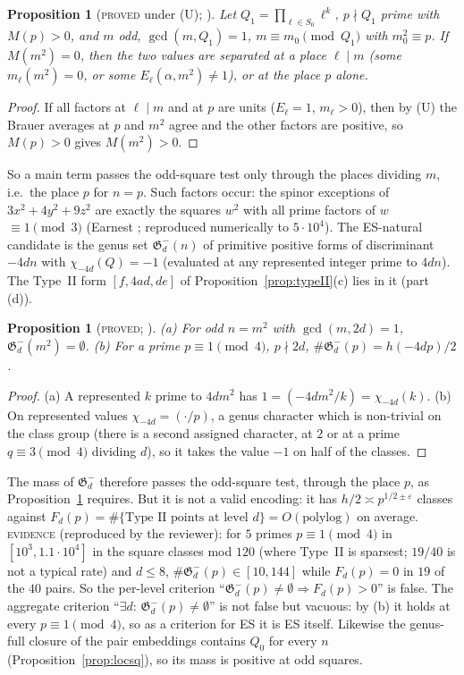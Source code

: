 \documentclass[10pt,reqno]{amsart}
\newtheorem{proposition}[theorem]{Proposition}
\theoremstyle{definition}
\numberwithin{equation}{section}
\newcommand{\status}[1]{\textup{\textsc{#1}}}
\begin{document}
\begin{proposition}[\status{proved} under (U); {\cite[\S5.1]{LF}}]\label{prop:Utest}
Let $Q_1=\prod_{\ell\in S_0}\ell^k$, $p\nmid Q_1$ prime with $M(p)>0$, and $m$ odd,
$\gcd(m,Q_1)=1$, $m\equiv m_0\pmod{Q_1}$ with $m_0^2\equiv p$. If $M(m^2)=0$,
then the two values are separated at a place $\ell\mid m$ (some $m_\ell(m^2)=0$,
or some $E_\ell(\alpha,m^2)\ne1$), or at the place $p$ alone.
\end{proposition}
\begin{proof}
If all factors at $\ell\mid m$ and at $p$ are units ($E_\ell=1$, $m_\ell>0$),
then by (U) the Brauer averages at $p$ and $m^2$ agree and the other factors
are positive, so $M(p)>0$ gives $M(m^2)>0$.
\end{proof}
So a main term passes the odd-square test only through the places
dividing $m$, i.e.\ the place $p$ for $n=p$. Such factors occur: the spinor exceptions of $3x^2+4y^2+9z^2$ are exactly the squares
$w^2$ with all prime factors of $w$ $\equiv1\pmod3$ (Earnest \cite[Prop.~5.1]{Ea};
reproduced numerically to $5\cdot10^4$). The ES-natural candidate is the
genus set $\mathfrak G^-_d(n)$ of primitive positive forms of
discriminant $-4dn$ with $\chi_{-4d}(Q)=-1$ (evaluated at any represented
integer prime to $4dn$). The Type~II form $[f,4ad,de]$ of
Proposition~\ref{prop:typeII}(c) lies in it (part (d)).

\begin{proposition}[\status{proved}; {\cite[\S5.3]{LF}}]\label{prop:genusminus}
\textup{(a)} For odd $n=m^2$ with $\gcd(m,2d)=1$, $\mathfrak G^-_d(m^2)=\emptyset$.
\textup{(b)} For a prime $p\equiv1\pmod4$, $p\nmid2d$,
$\#\mathfrak G^-_d(p)=h(-4dp)/2$.
\end{proposition}
\begin{proof}
(a) A represented $k$ prime to $4dm^2$ has
$1=(-4dm^2/k)=\chi_{-4d}(k)$. (b) On represented values $\chi_{-4d}=(\cdot/p)$,
a genus character which is non-trivial on the class group (there is a
second assigned character, at $2$ or at a prime $q\equiv3\pmod4$ dividing $d$),
so it takes the value $-1$ on half of the classes.
\end{proof}
The mass of $\mathfrak G^-_d$ therefore passes the odd-square test, through
the place $p$, as Proposition~\ref{prop:Utest} requires. But it is not a
valid encoding: it has $h/2\asymp p^{1/2\pm\varepsilon}$ classes against
$F_d(p)=\#\{\text{Type~II points at level }d\}=O(\text{polylog})$ on average.
\status{evidence} (reproduced by the reviewer): for $5$ primes
$p\equiv1\pmod4$ in $[10^3,1.1\cdot10^4]$ in the square classes mod $120$ (where
Type~II is sparsest; $19/40$ is not a typical rate) and $d\le8$,
$\#\mathfrak G^-_d(p)\in[10,144]$ while $F_d(p)=0$ in $19$ of the $40$ pairs. So
the per-level criterion ``$\mathfrak G^-_d(p)\ne\emptyset\Rightarrow F_d(p)>0$'' is
false. The aggregate criterion ``$\exists d$: $\mathfrak G^-_d(p)\ne\emptyset$'' is
not false but vacuous: by (b) it holds at every $p\equiv1\pmod4$, so as a
criterion for ES it is ES itself. Likewise the genus-full closure of the
pair embeddings contains $Q_0$ for every $n$
(Proposition~\ref{prop:locsq}), so its mass is positive at odd squares.
\end{document}
